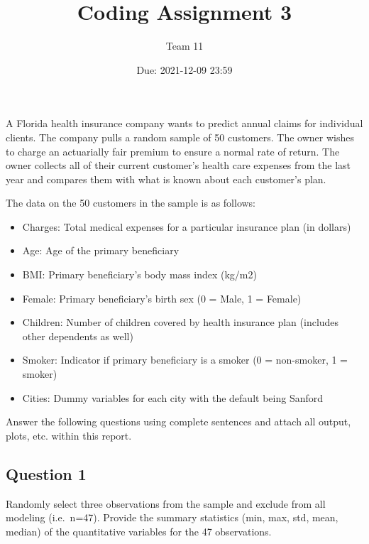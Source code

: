 \documentclass[
]{article}
\title{Coding Assignment 3}
\author{Team 11}
\date{Due: 2021-12-09 23:59}
\providecommand{\tightlist}{%
  \setlength{\itemsep}{0pt}\setlength{\parskip}{0pt}}
\begin{document}
\maketitle

{
\setcounter{tocdepth}{2}
\tableofcontents
}
A Florida health insurance company wants to predict annual claims for
individual clients. The company pulls a random sample of 50 customers.
The owner wishes to charge an actuarially fair premium to ensure a
normal rate of return. The owner collects all of their current
customer's health care expenses from the last year and compares them
with what is known about each customer's plan.

The data on the 50 customers in the sample is as follows:

\begin{itemize}
\tightlist
\item
  Charges: Total medical expenses for a particular insurance plan (in
  dollars)
\item
  Age: Age of the primary beneficiary
\item
  BMI: Primary beneficiary's body mass index (kg/m2)
\item
  Female: Primary beneficiary's birth sex (0 = Male, 1 = Female)
\item
  Children: Number of children covered by health insurance plan
  (includes other dependents as well)
\item
  Smoker: Indicator if primary beneficiary is a smoker (0 = non-smoker,
  1 = smoker)
\item
  Cities: Dummy variables for each city with the default being Sanford
\end{itemize}

Answer the following questions using complete sentences and attach all
output, plots, etc. within this report.

\hypertarget{question-1}{%
\subsection{Question 1}\label{question-1}}

Randomly select three observations from the sample and exclude from all
modeling (i.e.~n=47). Provide the summary statistics (min, max, std,
mean, median) of the quantitative variables for the 47 observations.
\end{document}
